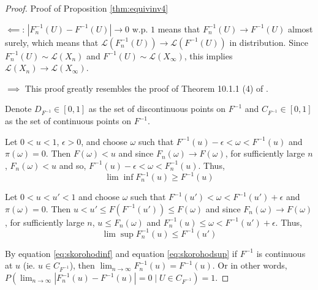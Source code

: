 \documentclass[12pt]{article}
\theoremstyle{plain}%
\theoremstyle{definition}
\begin{document}
		\begin{proof}{Proof of Proposition \ref{thm:equivinv4}}\label{pf:skorohod}
		
		$\impliedby$: $|F^{-1}_{n}(U)-F^{-1}(U)| \to 0 \text{ w.p. 1}$ means that $F^{-1}_{n}(U) \to F^{-1}(U)$ almost surely, which means that $\mathcal{L}(F^{-1}_{n}(U)) \to \mathcal{L}(F^{-1}(U))$ in distribution. Since $F^{-1}_{n}(U)\sim \mathcal{L}(X_n)$ and $F^{-1}(U)\sim\mathcal{L}(X_{\infty})$, this implies 
		$\mathcal{L}(X_n)\to \mathcal{L}(X_{\infty})$.
		
		$\implies$
		This proof greatly resembles the proof of Theorem 10.1.1 (4) of \cite{firstlook}.
		
		Denote $D_{F^{-1}}\in [0,1]$ as the set of discontinuous points on $F^{-1}$ and $C_{F^{-1}}\in [0,1]$ as the set of continuous points on $F^{-1}$.
		
		Let $0<u<1$,  $\epsilon>0$, and choose $\omega$ such that $F^{-1}(u)-\epsilon<\omega<F^{-1}(u)$ and $\pi(\omega)=0$. Then $F(\omega)<u$ and since $F_{n}(\omega)\to F(\omega)$, for sufficiently large $n$, $F_{n}(\omega)<u$ and so, $F^{-1}(u)-\epsilon<\omega<F^{-1}_{n}(u)$. Thus,
		\begin{equation}\label{eq:skorohodinf}
			\lim \inf F_{n}^{-1}(u)\geq F^{-1}(u)
		\end{equation}
		
		Let $0<u<u'<1$ and choose $\omega$ such that $F^{-1}(u')<\omega<F^{-1}(u')+\epsilon$ and $\pi(\omega)=0$. Then $u<u'\leq F(F^{-1}(u'))\leq F(\omega)$ and since $F_{n}(\omega)\to F(\omega)$, for sufficiently large $n$, $u\leq F_{n}(\omega)$ and $F^{-1}_{n}(u)\leq \omega < F^{-1}(u')+\epsilon$. Thus,
		\begin{equation}\label{eq:skorohodsup}
			\lim \sup F_n^{-1}(u)\leq F^{-1}(u')
		\end{equation}
		
		By equation \ref{eq:skorohodinf} and equation \ref{eq:skorohodsup} if $F^{-1}$ is continuous at $u$ (ie. $u\in C_{F^{-1}}$), then $\lim_{n\to \infty} F^{-1}_{n}(u)= F^{-1}(u)$. Or in other words, $P(\lim_{n\to \infty} |F^{-1}_{n}(u)- F^{-1}(u)|=0\mid U\in C_{F^{-1}})=1$. %
		

\end{proof}
\end{document}

